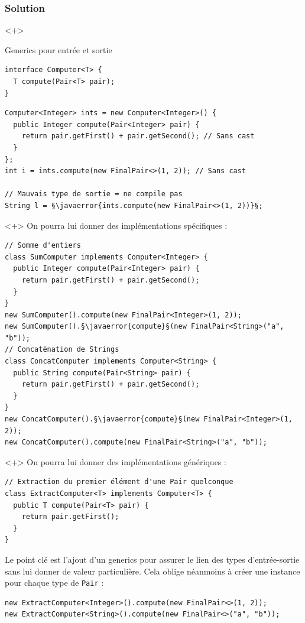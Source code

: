 \documentclass[draft]{beamer}
\makeatletter
\def\uwave{\bgroup\markoverwith{\lower4\p@\hbox{\sixly \textcolor{errorcolor}{\char58}}}\ULon}
\newcommand{\javaerror}[1]{%
  \uwave{#1}%
}
\makeatother
\begin{document}
\begin{frame}[fragile]
\frametitle{Solution}
\begin{onlyenv}<+>
\begin{exampleblock}{Generics pour entrée et sortie}
\begin{lstlisting}[numbers=none]
interface Computer<T> {
  T compute(Pair<T> pair);
}
\end{lstlisting}
\end{exampleblock}
\begin{lstlisting}
Computer<Integer> ints = new Computer<Integer>() {
  public Integer compute(Pair<Integer> pair) {
    return pair.getFirst() + pair.getSecond(); // Sans cast
  }
};
int i = ints.compute(new FinalPair<>(1, 2)); // Sans cast

// Mauvais type de sortie = ne compile pas
String l = §\javaerror{ints.compute(new FinalPair<>(1, 2))}§;
\end{lstlisting}
\end{onlyenv}
\begin{onlyenv}<+>
On pourra lui donner des implémentations spécifiques :
\begin{lstlisting}
// Somme d'entiers
class SumComputer implements Computer<Integer> {
  public Integer compute(Pair<Integer> pair) {
    return pair.getFirst() + pair.getSecond();
  }
}
new SumComputer().compute(new FinalPair<Integer>(1, 2));
new SumComputer().§\javaerror{compute}§(new FinalPair<String>("a", "b"));
// Concatènation de Strings
class ConcatComputer implements Computer<String> {
  public String compute(Pair<String> pair) {
    return pair.getFirst() + pair.getSecond();
  }
}
new ConcatComputer().§\javaerror{compute}§(new FinalPair<Integer>(1, 2));
new ConcatComputer().compute(new FinalPair<String>("a", "b"));
\end{lstlisting}
\end{onlyenv}
\begin{onlyenv}<+>
On pourra lui donner des implémentations génériques :
\begin{lstlisting}
// Extraction du premier élément d'une Pair quelconque
class ExtractComputer<T> implements Computer<T> {
  public T compute(Pair<T> pair) {
    return pair.getFirst();
  }
}
\end{lstlisting}
Le point clé est l'ajout d'un generics pour assurer le lien des types d'entrée-sortie sans lui donner de valeur particulière.
Cela oblige néanmoins à créer une instance pour chaque type de \lstinline{Pair} :
\begin{lstlisting}
new ExtractComputer<Integer>().compute(new FinalPair<>(1, 2));
new ExtractComputer<String>().compute(new FinalPair<>("a", "b"));
\end{lstlisting}
\end{onlyenv}
\end{frame}
\end{document}
